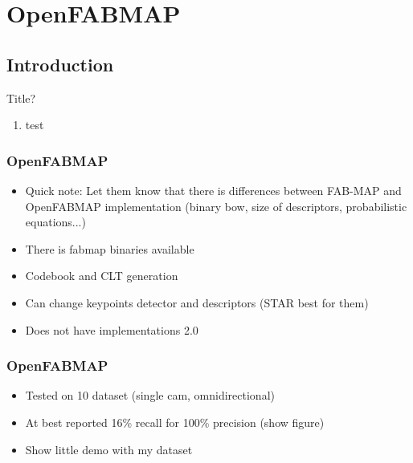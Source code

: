 \section{OpenFABMAP}

\subsection{Introduction}
\begin{frame}{Title?}
   \begin{enumerate}
       \item test
   \end{enumerate} 
\end{frame}


\begin{frame}
    \frametitle{OpenFABMAP}
    \begin{itemize}
        \item Quick note: Let them know that there is differences between FAB-MAP and OpenFABMAP implementation (binary bow, size of descriptors, probabilistic equations...)
        \item There is fabmap binaries available
        \item Codebook and CLT generation
        \item Can change keypoints detector and descriptors (STAR best for them)
        \item Does not have implementations 2.0
    \end{itemize}
\end{frame}

\begin{frame}
    \frametitle{OpenFABMAP}
    \begin{itemize}
        \item Tested on 10 dataset (single cam, omnidirectional)
        \item At best reported 16\% recall for 100\% precision (show figure)
        \item Show little demo with my dataset
    \end{itemize}
\end{frame}
